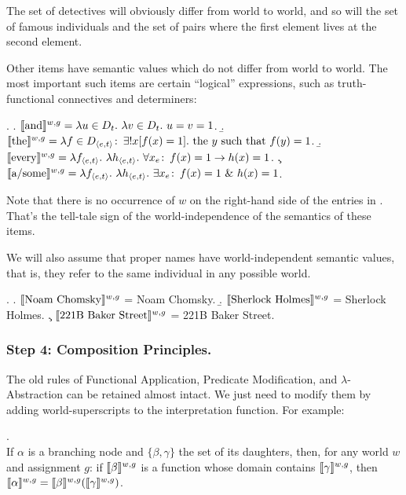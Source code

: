 The set of detectives will obviously differ from world to world, and so will the
set of famous individuals and the set of pairs where the first element lives at
the second element.

Other items have semantic values which do not differ from world to world. The
most important such items are certain ``logical'' expressions, such as
truth-functional connectives and determiners:

\ex. \a.
$\llbracket \mbox{and} \rrbracket^{w,g} = \lambda u \in D_t.\ \lambda v \in D_t.\ u=v=1
$.
\b.
$\llbracket \mbox{the} \rrbracket^{w,g} = \lambda f \in D_{\langle e,t \rangle}\colon\thinspace \exists !
x[f(x) = 1]. \mbox{ the } y \mbox{ such that } f(y) = 1$.
\b.
$\llbracket \mbox{every} \rrbracket^{w,g} = \lambda f_{\langle e,t \rangle}.\ \lambda
h_{\langle e,t \rangle}.\ \forall x_e\colon\thinspace f(x) = 1 \rightarrow h(x) = 1 $.
 \c.
$\llbracket \mbox{a/some} \rrbracket^{w,g} = \lambda f_{\langle e,t \rangle}.\ \lambda
h_{\langle e,t \rangle}.\ \exists x_e\colon\thinspace f(x) = 1\ \&\ h(x) = 1 $.

Note that there is no occurrence of $w$ on the right-hand side of the entries in
\Last. That's the tell-tale sign of the world-independence of the semantics of
these items.

We will also assume that proper names have world-independent semantic values,
that is, they refer to the same individual in any possible world.

\ex. \a. $\llbracket \mbox{Noam Chomsky} \rrbracket^{w,g}$ = Noam Chomsky. 
\b. $\llbracket \mbox{Sherlock Holmes} \rrbracket^{w,g}$ = Sherlock Holmes. 
\c. $\llbracket \mbox{221B Baker Street} \rrbracket^{w,g}$ = 221B Baker Street.

\subsubsection{Step 4: Composition Principles.} \label{sec:comp-princ}

The old rules of Functional Application, Predicate Modification, and
$\lambda$-Abstraction can be retained almost intact. We just need to modify them
by adding world-superscripts to the interpretation function. For example:

\ex. \\
If $\alpha$ is a branching node and $\{\beta, \gamma\}$ the set of its
daughters, then, for any world $w$ and assignment $g$: if
$\llbracket \beta \rrbracket^{w,g}$ is a function whose domain contains
$\llbracket \gamma \rrbracket^{w,g}$, then
$\llbracket \alpha \rrbracket^{w,g} = \llbracket \beta \rrbracket^{w,g} (\llbracket \gamma \rrbracket^{w,g})$.

